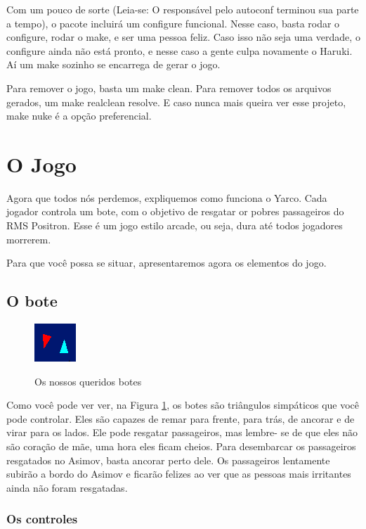 \documentclass[10pt,brazil]{article}
\begin{document}
Com um pouco de sorte (Leia-se: O responsável pelo autoconf terminou sua parte a tempo), o pacote incluirá um configure
funcional. Nesse caso, basta rodar o configure, rodar o make, e ser uma pessoa feliz. Caso isso não seja uma verdade,
o configure ainda não está pronto, e nesse caso a gente culpa novamente o Haruki. Aí um make sozinho se encarrega de
gerar o jogo.

Para remover o jogo, basta um make clean. Para remover todos os arquivos gerados, um make realclean resolve. E caso nunca
mais queira ver esse projeto, make nuke é a opção preferencial.

\section{O Jogo}

Agora que todos nós perdemos, expliquemos como funciona o Yarco. Cada jogador controla um bote, com o objetivo de resgatar
or pobres passageiros do RMS Positron. Esse é um jogo estilo arcade, ou seja, dura até todos jogadores morrerem.

Para que você possa se situar, apresentaremos agora os elementos do jogo.

\subsection{O bote}

\begin{figure}
\begin{center}
\includegraphics{boats}
\label{img:boat}
\caption{Os nossos queridos botes}
\end{center}
\end{figure}

Como você pode ver ver, na Figura \ref{img:boat}, os botes são triângulos simpáticos que você pode controlar. Eles são
capazes de remar para frente, para trás, de ancorar e de virar para os lados. Ele pode resgatar passageiros, mas lembre-
se de que eles não são coração de mãe, uma hora eles ficam cheios. Para desembarcar os passageiros resgatados no Asimov,
basta ancorar perto dele. Os passageiros lentamente subirão a bordo do Asimov e ficarão felizes ao ver que as pessoas mais
irritantes ainda não foram resgatadas.

\subsubsection{Os controles}
\end{document}
